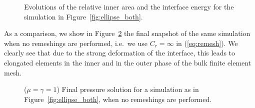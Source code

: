 \documentclass[a4paper,11pt,onecolumn]{article}
\begin{document}
\begin{figure}[htbp]
\centering
{}
\caption{Evolutions of the relative inner area and the interface energy for
the simulation in Figure~\ref{fig:ellipse_both}.}
\label{fig:ellipse_both_volumes}
\end{figure}
As a comparison, we show in Figure~\ref{fig:ellipse_smooth} the final snapshot
of the same simulation when no remeshings are performed, i.e.\ we use $C_r=
\infty$ in (\ref{eq:remesh}). We clearly see that due to the strong deformation
of the interface, this leads to elongated elements in the inner and in the
outer phase of the bulk finite element mesh.
\begin{figure}[htbp]
\centering
{}
\caption{($\mu=\gamma=1$) Final pressure solution for a simulation as in
Figure~\ref{fig:ellipse_both}, when no remeshings are performed.}
\label{fig:ellipse_smooth}
\end{figure}
\end{document}
